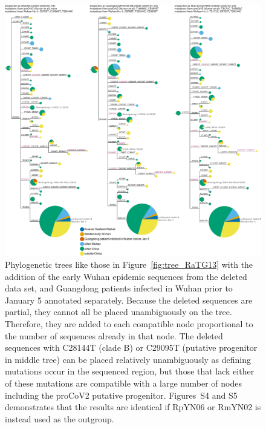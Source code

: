 \documentclass[9pt,twocolumn,twoside]{gsajnl_modified}
\begin{document}
 \begin{figure}
 \centerline{
 \includegraphics[width=\linewidth]{figures/Figure_5.pdf}
 }
 \caption{
Phylogenetic trees like those in Figure~\ref{fig:tree_RaTG13} with the addition of the early Wuhan epidemic sequences from the deleted data set, and Guangdong patients infected in Wuhan prior to January 5 annotated separately.
Because the deleted sequences are partial, they cannot all be placed unambiguously on the tree.
Therefore, they are added to each compatible node proportional to the number of sequences already in that node.
The deleted sequences with C28144T (clade B) or C29095T (putative progenitor in middle tree) can be placed relatively unambiguously as defining mutations occur in the sequenced region, but those that lack either of these mutations are compatible with a large number of nodes including the proCoV2 putative progenitor.
 Figures~S4 and S5 demonstrates that the results are identical if RpYN06 or RmYN02 is instead used as the outgroup.
\label{fig:tree_with_deleted}
 }
 \end{figure}
\end{document}
